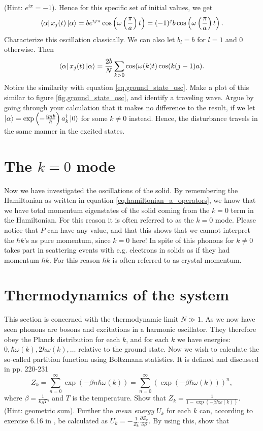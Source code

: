 \documentclass[10pt]{article}
\begin{document}
(Hint: $e^{i\pi} = -1$). Hence for this specific set of initial values, we get
\begin{equation}
\bra{\alpha}x_j(t)\ket{\alpha} = b e^{ij\pi}\cos\left(\omega\left(\frac{\pi}{a}\right)t\right) = (-1)^j b\cos\left(\omega\left(\frac{\pi}{a}\right)t\right). 
\end{equation}
Characterize this oscillation classically. We can also let $b_l=b$ for $l=1$ and $0$ otherwise. Then
\begin{equation}
\bra{\alpha}x_j(t)\ket{\alpha} = \frac{2b}{N}\sum_{k>0} \cos(\omega(k)t) \cos(k(j-1)a).
\end{equation}
Notice the similarity with equation \eqref{eq.ground_state_osc}. Make a plot of this similar to figure \ref{fig.ground_state_osc}, and identify a traveling wave. Argue by going through your calculation that it makes no difference to the result, if we let  $\ket{\alpha}=\exp\left(-\frac{ip_l b}{\hbar}\right) a_k^\dagger \ket{0}$ for some $k\neq 0$ instead. Hence, the disturbance travels in the same manner in the excited states. 

\section{The $k=0$ mode}
Now we have investigated the oscillations of the solid. By remembering the Hamiltonian as written in equation \eqref{eq.hamiltonian_a_operators}, we know that we have total momentum eigenstates of the solid coming from the $k=0$ term in the Hamiltonian. For this reason it is often referred to as the $k=0$ mode. Please notice that $P$ can have any value, and that this shows that we cannot interpret the $\hbar k$'s as pure momentum, since $k=0$ here! In spite of this phonons for $k\neq 0$ takes part in scattering events with e.g. electrons in solids as if they had momentum $\hbar k$. For this reason $\hbar k$ is often referred to as crystal momentum. 


\newpage
\section{Thermodynamics of the system}
This section is concerned with the thermodynamic limit $N\gg 1$. As we now have seen phonons are bosons and excitations in a harmonic oscillator. They therefore obey the Planck distribution for each $k$, and for each $k$ we have energies: $0, \hbar\omega(k), 2\hbar\omega(k), \dots$ relative to the ground state. Now we wish to calculate the so-called partition function using Boltzmann statistics. It is defined and discussed in \cite{Schroeder} pp. 220-231
\begin{equation}
Z_k = \sum_{n=0}^\infty \exp(-\beta n\hbar\omega(k)) =  \sum_{n=0}^\infty (\exp(-\beta \hbar\omega(k)))^n,
\end{equation}
where $\beta = \frac{1}{k_BT}$, and $T$ is the temperature. Show that $Z_k = \frac{1}{1-\exp(-\beta\hbar\omega(k))}$. (Hint: geometric sum).  Further the \textit{mean energy} $U_k$ for each $k$ can, according to exercise 6.16 in \cite{Schroeder}, be calculated as $U_k = -\frac{1}{Z_k}\frac{\partial Z_k}{\partial \beta}$. By using this, show that
\end{document}
